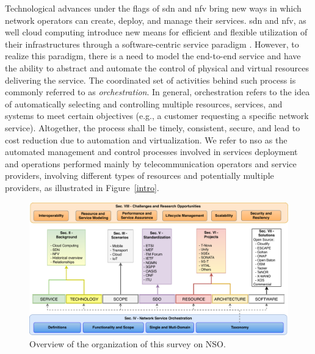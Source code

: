 Technological advances under the flags of \gls{sdn} \cite{surveySDN} and \gls{nfv} \cite{Mijumbi2016NetworkChallenges} bring new ways in which network operators can create, deploy, and manage their services. \gls{sdn} and \gls{nfv}, as well cloud computing introduce new means for efficient and flexible utilization of their infrastructures through a software-centric service paradigm \cite{Sonkoly2014UNIFYingView}. However, to realize this paradigm, there is a need to model the end-to-end service and have the ability to abstract and automate the control of physical and virtual resources delivering the service. The coordinated set of activities behind such process is commonly referred to as \textit{orchestration}. In general, orchestration refers to the idea of automatically selecting and controlling multiple resources, services, and systems to meet certain objectives (e.g., a customer requesting a specific network service). Altogether, the process shall be timely, consistent, secure, and lead to cost reduction due to automation and virtualization. We refer to \gls{nso} as the automated management and control processes involved in services deployment and operations  performed mainly by telecommunication operators and service providers, involving different types of resources and potentially multiple providers, as illustrated in Figure~\ref{intro}.



\begin{figure}[t!]
  \centering
  \includegraphics[scale=.6]{Figures/01_Introduction/org}
    \caption{Overview of the organization of this survey on NSO.}
    \label{org}
\end{figure}

